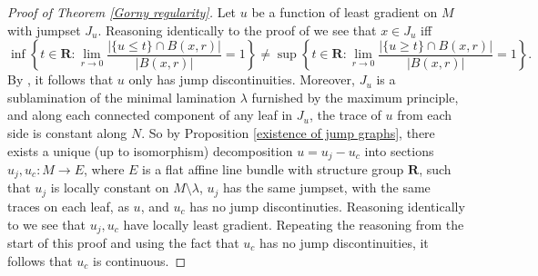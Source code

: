 \documentclass[reqno,10pt]{amsart}
\newcommand{\RR}{\mathbf{R}}
\theoremstyle{definition}
\numberwithin{equation}{section}
\begin{document}
\begin{proof}[Proof of Theorem \ref{Gorny regularity}]
Let $u$ be a function of least gradient on $M$ with jumpset $J_u$.
Reasoning identically to the proof of \cite[Proposition 3.9]{górny2017planar} we see that $x \in J_u$ iff
$$\inf\left\{t \in \RR: \lim_{r \to 0} \frac{|\{u \leq t\} \cap B(x, r)|}{|B(x, r)|} = 1\right\} \neq \sup\left\{t \in \RR: \lim_{r \to 0} \frac{|\{u \geq t\} \cap B(x, r)|}{|B(x, r)|} = 1\right\}.$$
By \cite[Theorem 4.1]{HakkarainenKorteLahtiShanmugalingam+2015}, it follows that $u$ only has jump discontinuities.
Moreover, $J_u$ is a sublamination of the minimal lamination $\lambda$ furnished by the maximum principle, and along each connected component of any leaf in $J_u$, the trace of $u$ from each side is constant along $N$.
So by Proposition \ref{existence of jump graphs}, there exists a unique (up to isomorphism) decomposition $u = u_j - u_c$ into sections $u_j, u_c: M \to E$, where $E$ is a flat affine line bundle with structure group $\RR$, such that $u_j$ is locally constant on $M \setminus \lambda$, $u_j$ has the same jumpset, with the same traces on each leaf, as $u$, and $u_c$ has no jump discontinuties.
Reasoning identically to \cite[pg11]{górny2017planar} we see that $u_j, u_c$ have locally least gradient.
Repeating the reasoning from the start of this proof and using the fact that $u_c$ has no jump discontinuities, it follows that $u_c$ is continuous.
\end{proof}



\end{document}
